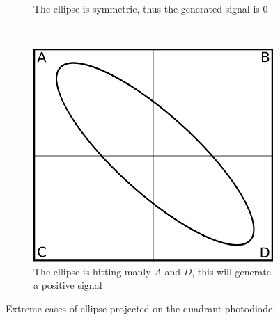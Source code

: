 \documentclass[a4paper,10pt]{article}
\begin{document}
\begin{figure}[H]
\begin{subfigure}[t]{0.3\textwidth}
    \caption{The ellipse is symmetric, thus the generated signal is 0}
  \end{subfigure}
  ~
  \begin{subfigure}[t]{0.3\textwidth}
    \centering
    \includegraphics[width = \textwidth]{ellipse2}
    \caption{The ellipse is hitting manly $A$ and $D$, this will generate a positive signal}
  \end{subfigure}
  \caption{Extreme cases of ellipse projected on the quadrant photodiode.}
  \label{fig:ellipses}
\end{figure}
\end{document}
